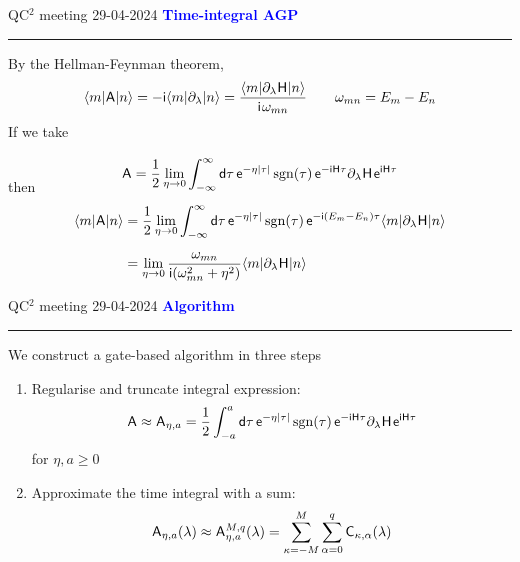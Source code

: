 \documentclass{beamer}
\def\lbt{\small QC$^2$ meeting 29-04-2024} %
\DeclareMathOperator{\sgn}{sgn}
\def\mt#1{\kern0.025em\mathsf{#1}\kern0.025em}
\def\d{\mathsf d}
\def\e{\mathsf e}
\def\i{\mathsf i}
\def\A{\mt A}
\def\H{\mt H}
\def\+{\kern0.0833em}
\newenvironment{dia}[2]
{
	\begin{frame}
	\vspace{1mm}
	{\small #1}
	\hfill
    {\small\bf\textcolor{blue}{#2}}
	\vspace{3mm}
	\hrule
	\bigskip
}
{
	\vfill
	\end{frame}
}
\begin{document}
\begin{dia}{\lbt}{Time-integral AGP}
By the Hellman-Feynman theorem,
\begin{align*}
    \bra m \A \ket n = -\i \bra m \partial_\lambda \ket n = \frac{\bra m \partial_\lambda\H \ket n}{\i \+ \omega_{mn}} \quad \quad \omega_{mn} = E_m - E_n
\end{align*} \pause
If we take
\begin{align*}
    \A = \frac12 \lim_{\eta\to0} \int_{-\infty}^\infty \d\tau \, \e^{-\eta|\tau|} \sgn(\tau) \, \e^{-\i\H\tau} \partial_\lambda \H \+ \e^{\i\H\tau} \\[-8mm]
\end{align*} \pause
then
\begin{align*}
    \bra m \A \ket n &= \frac12 \lim_{\eta\to0} \int_{-\infty}^\infty \d\tau \, \e^{-\eta|\tau|} \sgn(\tau) \, \e^{-\i(E_m - E_n)\tau} \bra m \partial_\lambda \H \ket n \\[2mm]
    &= \lim_{\eta\to0} \frac{\omega_{mn}}{\i(\omega_{mn}^2 + \eta^2)} \bra m \partial_\lambda \mt H \ket n
\end{align*}
\vspace{-1.4cm}
\end{dia}

\begin{dia}{\lbt}{Algorithm}
We construct a gate-based algorithm in three steps \pause
\begin{enumerate}
    \item Regularise and truncate integral expression:
    \begin{align*}
        \A \approx \A_{\eta, a} = \frac12 \int_{-a}^a \d\tau \, \e^{-\eta|\tau|} \sgn(\tau) \, \e^{-\i\H\tau} \partial_\lambda \H \+ \e^{\i\H\tau}
    \end{align*}
    for $\eta, a \geq 0$ \pause
    \item Approximate the time integral with a sum:
    \begin{align*}
        \A_{\eta, a}(\lambda) \approx \A_{\eta, a}^{M, q}(\lambda) = \sum_{\kappa = -M}^M \sum_{\alpha = 0}^q \mt C_{\kappa, \alpha}(\lambda)
    \end{align*}
\end{enumerate}
\vspace{0.65cm}
\end{dia}
\end{document}
